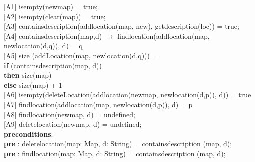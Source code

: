 \documentclass[12pt]{article}
\begin{document}
\begin{spacing}{1.5}
\hspace*{5mm} [A1] isempty(newmap) = true;\\
\hspace*{5mm} [A2] isempty(clear(map)) = true;\\
\hspace*{5mm} [A3] containsdescription(addlocation(map, new), getdescription(loc)) = true;\\
\hspace*{5mm} [A4] containsdescription(map,d) $\rightarrow$ findlocation(addlocation(map, newlocation(d,q)), d) \hspace*{15mm} = q \\
\hspace*{5mm} [A5] size (addLocation(map, newlocation(d,q))) = \\ \hspace*{15mm} \textbf{if} (containsdescription(map, d)) \\ \hspace*{25mm}\textbf{then} size(map) \\ \hspace*{15mm} \textbf{else} size(map) + 1\\
\hspace*{5mm} [A6] isempty(deleteLocation(addlocation(newmap, newlocation(d,p)), d)) = true \\
\hspace*{5mm} [A7] findlocation(addlocation(map, newlocation(d,p)), d) = p\\
\hspace*{5mm} [A8] findlocation(newmap, d) = undefined;\\
\hspace*{5mm} [A9] deletelocation(newmap, d) = undefined;\\
\hspace*{5mm} \textbf{preconditions}:\\
\hspace*{10mm} \textbf{pre} : deletelocation(map: Map, d: String) = containsdescription (map, d);\\
\hspace*{10mm} \textbf{pre} : findlocation(map: Map, d: String) = containsdescription (map, d);\\
\end{spacing}
\end{document}
